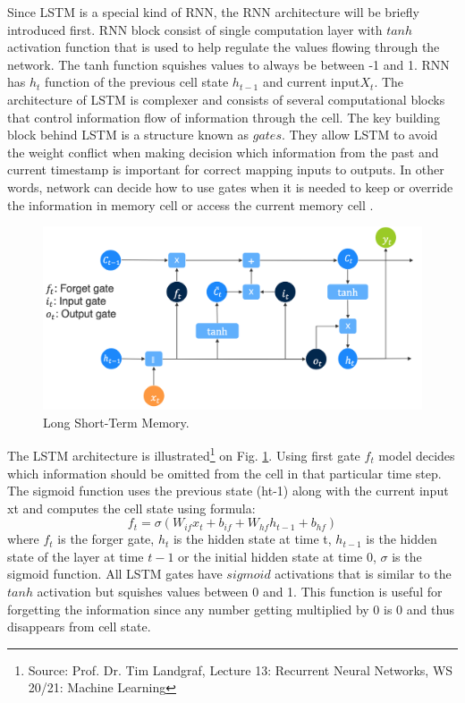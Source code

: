 Since LSTM is a special kind of RNN, the RNN architecture will be briefly introduced first. RNN block consist of single computation layer with $tanh$ activation function that is used to help regulate the values flowing through the network. The tanh function squishes values to always be between -1 and 1. RNN has $h_{t}$ function of the previous cell state $h_{t-1}$ and current input$ X_{t}$. The architecture of LSTM is complexer and consists of several computational blocks that control information flow of information through the cell. The key building block behind LSTM is a structure known as $gates$. They allow LSTM to avoid the weight conflict when making decision which information from the past and current timestamp is important for correct mapping inputs to outputs. In other words, network can decide how to use gates when it is needed to keep or override the information in memory cell or access the current memory cell \cite{lstm_orig}. 

\begin{figure}[htb]
	\begin{center}
		\includegraphics[width=1\textwidth, keepaspectratio]{gfx/lstm.png}
		\caption{\label{fig:lstm}Long Short-Term Memory.}
	\end{center}
\end{figure}
The LSTM architecture is illustrated\footnote{Source: Prof. Dr. Tim Landgraf, Lecture 13: Recurrent Neural Networks, WS 20/21: Machine Learning} on Fig. \ref{fig:lstm}. Using first gate $f_t$ model decides which information should be omitted from the cell in that particular time step. The sigmoid function uses the previous state (ht-1) along with the current input xt and computes the cell state using formula:
\begin{equation}
f_t = \sigma (W_{if}x_t + b_{if} + W_{hf}h_{t-1} + b_{hf})
\end{equation}
where $f_t$ is the forger gate, $h_{t}$  is the hidden state at time t, $h_{t-1}$ is the hidden state of the layer at time $t-1$ or the initial hidden state at time $0$, $\sigma$ is the sigmoid function. All LSTM gates have $sigmoid$ activations that  is similar to the $tanh$ activation but squishes values between 0 and 1. This function is useful for forgetting the information since any number getting multiplied by 0 is 0 and thus disappears from cell state. 

